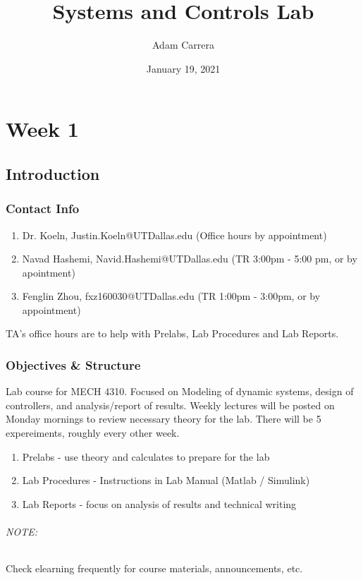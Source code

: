 \documentclass[12pt, a4paper]{report}
\title{Systems and Controls Lab}
\author{Adam Carrera}
\date{January 19, 2021}
\begin{document}
  \maketitle
  \tableofcontents
  \part{Week 1}

  \chapter{Introduction}

  \section{Contact Info}

  \begin{enumerate}
    \item Dr. Koeln, Justin.Koeln@UTDallas.edu (Office hours by appointment)
    \item Navad Hashemi, Navid.Hashemi@UTDallas.edu (TR 3:00pm - 5:00 pm, or by apointment)
    \item Fenglin Zhou, fxz160030@UTDallas.edu (TR 1:00pm - 3:00pm, or by appointment)
  \end{enumerate}

  TA's office hours are to help with Prelabs, Lab Procedures and Lab Reports.

  \section{Objectives \& Structure}

  Lab course for MECH 4310. Focused on Modeling of dynamic systems, design of controllers, and analysis/report of results. Weekly lectures will be posted on Monday mornings to review necessary theory for the lab. There will be 5 expereiments, roughly every other week.

  \begin{enumerate}
    \item Prelabs - use theory and calculates to prepare for the lab
    \item Lab Procedures - Instructions in Lab Manual (Matlab / Simulink)
    \item Lab Reports - focus on analysis of results and technical writing
  \end{enumerate}

  \paragraph{NOTE:} Check elearning frequently for course materials, announcements, etc.
\end{document}
